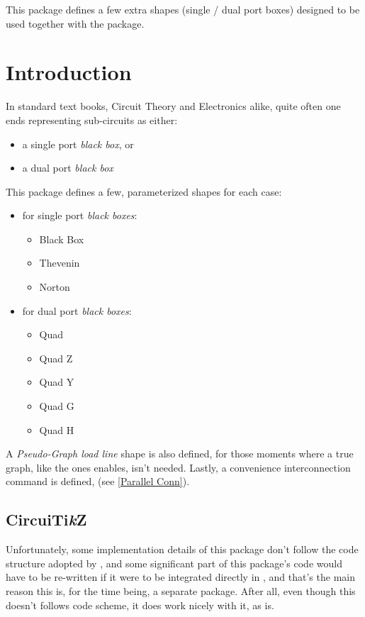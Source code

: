 \documentclass[10pt]{article}
\begin{document}
  

\begin{typesetabstract}
 
This package defines a few extra shapes (single / dual port boxes) designed to be used together with the  package.
\end{typesetabstract}
\tableofcontents

\section{Introduction}
In standard text books, Circuit Theory and Electronics alike, quite often one ends representing sub-circuits as either:
\begin{itemize}
  \item a single port \emph{black box}, or
  \item a dual port \emph{black box}
\end{itemize}

This package defines a few, parameterized shapes for each case:
\begin{itemize}
  \item for single port \emph{black boxes}:
  \begin{itemize}
    \item Black Box
    \item Thevenin
    \item Norton
  \end{itemize}
  \item for dual port \emph{black boxes}:
  \begin{itemize}
    \item Quad
    \item Quad Z
    \item Quad Y
    \item Quad G
    \item Quad H
  \end{itemize}
\end{itemize}
A \emph{Pseudo-Graph load line} shape is also defined, for those moments where a true graph, like the ones  enables, isn't needed.
Lastly, a convenience interconnection command is defined, \tsobj{\QuadParConnect} (see \ref{Parallel Conn}).
 
 \subsection{CircuiTi\emph{k}Z}
 Unfortunately, some implementation details of this package don't follow the code structure  adopted by , and some significant part of this package's code would have to be re-written if it were to be integrated directly in , and that's the main reason this is, for the time being, a separate package. After all, even though this doesn't follows  code scheme, it does work nicely with it, as is.
 
\end{document}
